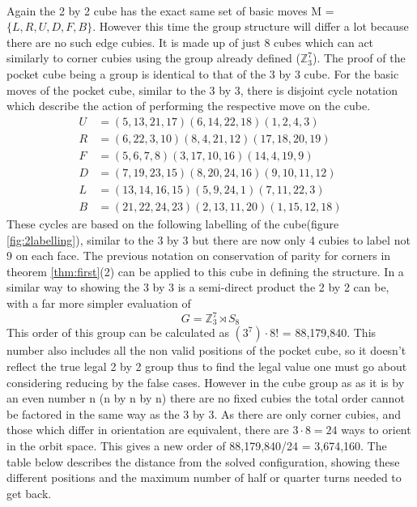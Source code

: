 \documentclass{article}
\newcounter{theo}[section]\setcounter{theo}{0}
\begin{document}
\paragraph*{}
Again the 2 by 2 cube has the exact same set of basic moves M = $\{L,R,U,D,F,B\}$. However this time the group structure will differ a lot because there are no such edge cubies. It is made up of just 8 cubes which can act similarly to corner cubies using the group already defined ($\mathbb{Z}_{3}^{7}$). The proof of the pocket cube being a group is identical to that of the 3 by 3 cube.
For the basic moves of the pocket cube, similar to the 3 by 3, there is disjoint cycle notation which describe the action of performing the respective move on the cube. 
\begin{align*}
U&=(5,13,21,17)(6,14,22,18)(1,2,4,3)\\
R&=(6,22,3,10)(8,4,21,12)(17,18,20,19)\\
F&=(5,6,7,8)(3,17,10,16)(14,4,19,9)\\
D&=(7,19,23,15)(8,20,24,16)(9,10,11,12)\\
L&=(13,14,16,15)(5,9,24,1)(7,11,22,3)\\
B&= (21,22,24,23)(2,13,11,20)(1,15,12,18)
\end{align*}
These cycles are based on the following labelling of the cube(figure \ref{fig:2labelling}), similar to the 3 by 3 but there are now only 4 cubies to label not 9 on each face. The previous notation on conservation of parity for corners in theorem \ref{thm:first}(2) can be applied to this cube in defining the structure. In a similar way to showing the 3 by 3 is a semi-direct product the 2 by 2 can be, with a far more simpler evaluation of 
\begin{equation}
G = \mathbb{Z}^{7}_{3} \rtimes S_8
\end{equation}
This order of this group can be calculated as $(3^7)\cdot 8!$ = 88,179,840. This number also includes all the non valid positions of the pocket cube, so it doesn't reflect the true legal 2 by 2 group thus to find the legal value one must go about considering reducing by the false cases. However in the cube group as as it is by an even number n (n by n by n) there are no fixed cubies the total order cannot be factored in the same way as the 3 by 3. As there are only corner cubies, and those which differ in orientation are equivalent, there are $3\cdot 8=24$ ways to orient in the orbit space. This gives a new order of 88,179,840/24 = 3,674,160.
The table below describes the distance from the solved configuration, showing these different positions and the maximum number of half or quarter turns needed to get back.
\end{document}

